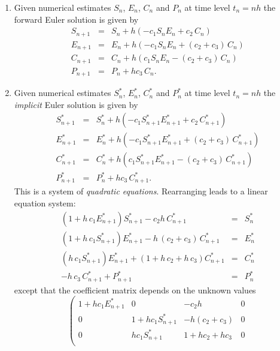 \documentclass[11pt,a4paper]{article}
\begin{document}
\begin{enumerate}
{\begin{enumerate}
	\item
	Given  numerical estimates $S_{n}$,   $E_{n}$,  $C_{n}$ and  $P_{n}$
          at time level $t_n=nh$ the forward Euler 
	solution is given by 
	\begin{eqnarray*}
       S_{n+1}   &= &  S_{n} +h( -c_1 S_n E_n  +c_2\,C_n)\\
       E_{n+1}  &= &   E_{n}  +h(  -c_1 S_n E_n  + (c_2 +c_3) \,C_n)\\
      C_{n+1}  &= &   C_{n} +h( c_1 S_n E_n  - (c_2 +c_3) \,C_n)\\
      P_{n+1}   &= &   P_{n}+h  c_3 \,C_n.
\end{eqnarray*}

\item 
	Given  numerical estimates $S^*_{n}$,   $E^*_{n}$,  $C^*_{n}$ and  $P^*_{n}$
          at time level $t_n=nh$  the {\it implicit} Euler solution is given by 
	\begin{eqnarray*}
       S^*_{n+1}   &= &  S^*_{n} +h( -c_1 S^*_{n+1} E^*_{n+1}  +c_2\,C^*_{n+1})\\
       E^*_{n+1}  &= &   E^*_{n}  +h(  -c_1 S^*_{n+1} E^*_{n+1}  + (c_2 +c_3) \,C^*_{n+1})\\
      C^*_{n+1}  &= &   C^*_{n} +h( c_1 S^*_{n+1} E^*_{n+1}  - (c_2 +c_3) \,C^*_{n+1})\\
      P^*_{n+1}   &= &   P^*_{n}+h  c_3 \,C^*_{n+1}.
\end{eqnarray*}
This is a system of {\it quadratic equations}. 
Rearranging leads to a linear equation system:	
\begin{eqnarray*}
      (1+ h\, c_1 E^*_{n+1} )S^*_{n+1}   - c_2 h \,C^*_{n+1} &= &  S^*_{n} \\
     (1+ h\, c_1 S^*_{n+1} )  E^*_{n+1}  - h\, (c_2 +c_3) \,C^*_{n+1} &= &   E^*_{n}  \\
     (h \, c_1 S^*_{n+1}) E^*_{n+1} +  (1  +h\,  c_2 + h\,c_3) C^*_{n+1}  &= &   C^*_{n}   \\
      -h\,  c_3 \,C^*_{n+1} +   P^*_{n+1}  &= &   P^*_{n} \end{eqnarray*}
     except that  the coefficient  matrix depends on the unknown values
$$\left ( \begin{array}{cccc}
         1+ h  c_1 E^*_{n+1} & 0 &  - c_2 h  & 0 \\
        0 &  1+ h  c_1 S^*_{n+1}  & - h  (c_2 +c_3) & 0 \\
        0 & h  c_1 S^*_{n+1} & 1  +h  c_2 + h c_3 & 0 \\

\end{array}$$
\end{enumerate}}
\end{enumerate}
\end{document}
